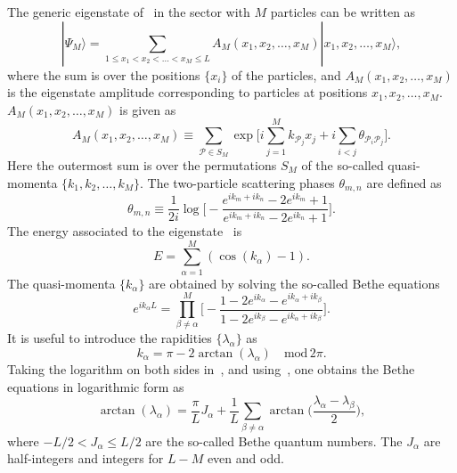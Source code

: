 \documentclass[11pt]{iopart}
\begin{document}
The generic eigenstate of~ in the sector with $M$ particles can be written as 
%
\begin{equation}
\label{ba_eig}
|\Psi_M\rangle=\sum\limits_{1\le x_1<x_2<\dots<x_M\le L}A_M(x_1,x_2,
\dots,x_M)|x_1,x_2,\dots,x_M\rangle,
\end{equation}
%
where the sum is over the positions $\{x_i\}$ of the particles, and $A_M(x_1,
x_2,\dots,x_M)$ is the eigenstate amplitude corresponding to particles 
at positions $x_1,x_2,\dots, x_M$. $A_M(x_1,x_2,\dots, x_M)$ is given as 
%
\begin{equation}
\label{ba_amp}
A_M(x_1,x_2,\dots,x_M)\equiv\sum\limits_{{\mathcal P}\in S_M}\exp\Big[i
\sum\limits_{j=1}^Mk_{{\mathcal P}_j}x_j+i\sum\limits_{i<j}\theta_{{
\mathcal P}_i{\mathcal P}_j}\Big].
\end{equation}
%
Here the outermost sum is over the permutations $S_M$ 
of the so-called quasi-momenta $\{k_1,k_2,\dots,k_M\}$. The two-particle 
scattering phases $\theta_{m,n}$ are defined as 
%
\begin{equation}
\label{s_phases}
\theta_{m,n}\equiv \frac{1}{2i}\log\Big[-\frac{e^{ik_m+ik_n}-2e^{ik_m}+1}
{e^{ik_m+ik_n}-2e^{ik_n}+1}\Big].
\end{equation}
%
The energy associated to the eigenstate~ is  
%
\begin{equation}
\label{ba_ener}
E=\sum\limits_{\alpha=1}^M(\cos(k_\alpha)-1).
\end{equation}
%
The quasi-momenta $\{k_\alpha\}$ are obtained by solving the so-called 
Bethe equations  
%
\begin{equation}
\label{ba_eq}
e^{ik_\alpha L}=\prod\limits^M_{\beta\ne\alpha}\Big[-\frac{1-2e^{
ik_\alpha}-e^{ik_\alpha+ik_\beta}}{1-2e^{ik_\beta}-e^{ik_\alpha+
ik_\beta}}\Big].
\end{equation}
%
It is useful to  introduce the rapidities $\{\lambda_\alpha\}$ as 
%
\begin{equation}
\label{rap}
k_\alpha=\pi-2\arctan(\lambda_\alpha)\quad\mbox{mod}\, 2\pi.
\end{equation}
%
Taking the logarithm on both sides in~, and using~, 
one obtains the Bethe equations in logarithmic form as 
%
\begin{equation}
\label{ba_eq_log}
\arctan(\lambda_\alpha)=\frac{\pi}{L}J_\alpha+\frac{1}{L}\sum\limits_{
\beta\ne\alpha}\arctan\Big(\frac{\lambda_\alpha-\lambda_\beta}{2}\Big),
\end{equation}
%
where $-L/2<J_\alpha\le L/2$ are the so-called Bethe quantum numbers. The 
$J_\alpha$ are half-integers and integers for $L-M$ even and odd. 
\end{document}
